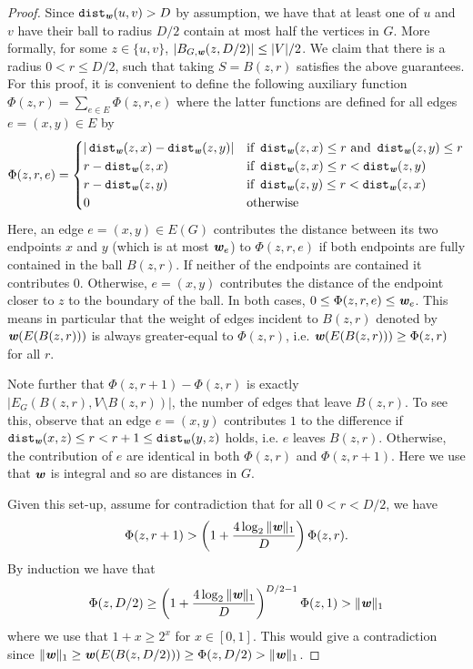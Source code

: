 \sepLem*
\begin{proof}
Since $\operatorname{\mathtt{dist}}_{\boldsymbol{{\mathit{w}}}}(u,v) > D$ by assumption, we have that at least one of $u$ and $v$ have their ball to radius $D/2$ contain at most half the vertices in $G$. More formally, for some $z \in \{u,v\}$, $|B_{G, \boldsymbol{{\mathit{w}}}}(z, D/2)| \leq |V|/2$. We claim that there is a radius $0 < r \leq D/2$, such that taking $S = B(z, r)$ satisfies the above guarantees. 
For this proof, it is convenient to define the following auxiliary function $\Phi(z,r) = \sum_{e \in E} \Phi(z,r,e)$ where the latter functions are defined for all edges $e = (x,y) \in E$ by
\[
   \Phi(z, r, e) = 
    \begin{cases} 
         |\operatorname{\mathtt{dist}}_{\boldsymbol{{\mathit{w}}}}(z,x) - \operatorname{\mathtt{dist}}_{\boldsymbol{{\mathit{w}}}}(z,y)|  & \text{if } \operatorname{\mathtt{dist}}_{\boldsymbol{{\mathit{w}}}}(z,x)  \leq r \text{ and } \operatorname{\mathtt{dist}}_{\boldsymbol{{\mathit{w}}}}(z,y) \leq r\\
        r - \operatorname{\mathtt{dist}}_{\boldsymbol{{\mathit{w}}}}(z,x) & \text{if } \operatorname{\mathtt{dist}}_{\boldsymbol{{\mathit{w}}}}(z,x) \leq r < \operatorname{\mathtt{dist}}_{\boldsymbol{{\mathit{w}}}}(z,y)\\
        r - \operatorname{\mathtt{dist}}_{\boldsymbol{{\mathit{w}}}}(z,y) & \text{if } \operatorname{\mathtt{dist}}_{\boldsymbol{{\mathit{w}}}}(z,y) \leq r < \operatorname{\mathtt{dist}}_{\boldsymbol{{\mathit{w}}}}(z,x)\\
        0 & \text{otherwise}
    \end{cases}
\]
Here, an edge $e = (x,y) \in E(G)$ contributes the distance between its two endpoints $x$ and $y$ (which is at most $\boldsymbol{\mathit{w}}_e$) to $\Phi(z,r,e)$ if both endpoints are fully contained in the ball $B(z,r)$. If neither of the endpoints are contained it contributes $0$. Otherwise, $e = (x,y)$ contributes the distance of the endpoint closer to $z$ to the boundary of the ball. In both cases, $0 \leq \Phi(z, r, e) \leq \boldsymbol{{\mathit{w}}}_e$. This means in particular that the weight of edges incident to $B(z,r)$ denoted by $\boldsymbol{{\mathit{w}}}(E(B(z,r)))$ is always greater-equal to $\Phi(z,r)$, i.e. $\boldsymbol{{\mathit{w}}}(E(B(z,r))) \geq \Phi(z,r)$ for all $r$.

Note further that $\Phi(z, r+1) - \Phi(z,r)$ is exactly $|E_G(B(z, r), V \setminus B(z, r))|$, the number of edges that leave $B(z,r)$. 
To see this, observe that an edge $e = (x, y)$ contributes $1$ to the difference if $\operatorname{\mathtt{dist}}_{\boldsymbol{{\mathit{w}}}}(x, z) \le r < r+1 \le \operatorname{\mathtt{dist}}_{\boldsymbol{{\mathit{w}}}}(y, z)$ holds, i.e. $e$ leaves $B(z, r)$.
Otherwise, the contribution of $e$ are identical in both $\Phi(z, r)$ and $\Phi(z, r+1).$
Here we use that $\boldsymbol{{\mathit{w}}}$ is integral and so are distances in $G$.


Given this set-up, assume for contradiction that for all $0 < r < D/2$, we have 
\[\Phi(z,r+1) > \left(1+ \frac{4 \log_2 \|\boldsymbol{{\mathit{w}}}\|_1}{D}\right) \Phi(z,r).\] 
By induction we have that 
\[\Phi(z, D/2) \geq \left(1+ \frac{4 \log_2 \|\bwInt\|_1}{D}\right)^{D/2 - 1} \Phi(z,1)%
>\|\bwInt\|_1\] where we use that $1+x \geq 2^x$ for $x \in [0,1]$.
This would give a contradiction since $\|\boldsymbol{{\mathit{w}}}\|_1 \ge \boldsymbol{{\mathit{w}}}(E(B(z,D/2))) \geq \Phi(z,D/2) > \|\boldsymbol{{\mathit{w}}}\|_1$.


\end{proof}
